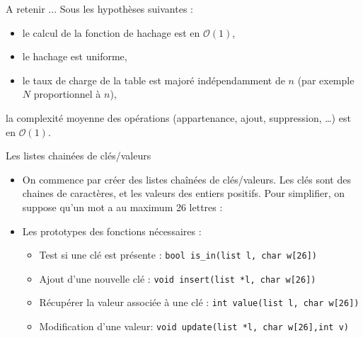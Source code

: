 \documentclass[10pt]{beamer}
\begin{document}
\begin{frame}{\Ctitle}{\stitle}
	\begin{block}{A retenir ...}
			Sous les hypothèses suivantes :
			\begin{itemize}
			\item<2-> le calcul de la fonction de hachage  est en $\mathcal{O}(1)$,
			\item<2-> le hachage est uniforme,
			\item<2-> le taux de charge de la table est majoré indépendamment de $n$ (par exemple $N$ proportionnel à $n$),
			\end{itemize}
			la complexité moyenne des opérations (appartenance, ajout, suppression, \dots) est en $\mathcal{O}(1)$.
	\end{block}
\end{frame}


\begin{frame}{\Ctitle}{\stitle}
	\begin{block}{Les listes chainées de clés/valeurs}
		\begin{itemize}
			\item<1-> On commence par créer des listes chaînées de clés/valeurs. Les clés sont des chaines de caractères, et les valeurs des entiers positifs. Pour simplifier, on suppose qu'un mot a au maximum 26 lettres :
				\onslide<2->{\inputpartC{\SPATH/count.c}{}{\scriptsize}{9}{16}}
			\item<3-> Les prototypes des fonctions nécessaires :
				\begin{itemize}
					\item<4-> Test si une clé est présente : \texttt{bool is_in(list l, char w[26])}
					\item<5-> Ajout d'une nouvelle clé : \texttt{void insert(list *l, char w[26])}
					\item<6-> Récupérer la valeur associée à une clé : \texttt{int value(list l, char w[26])}
					\item<7-> Modification d'une valeur: \texttt{void update(list *l, char w[26],int v)}
				\end{itemize}
		\end{itemize}
	\end{block}
\end{frame}
\end{document}
